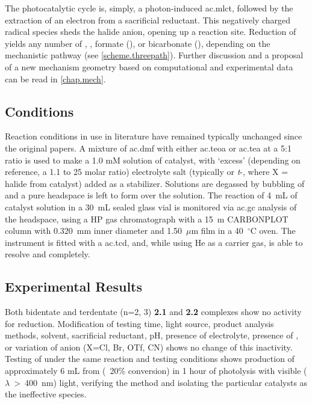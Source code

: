 The photocatalytic cycle is, simply, a photon-induced \gls{ac.mlct}, followed by the extraction of an electron from a sacrificial reductant. This negatively charged radical species sheds the halide anion, opening up a reaction site. Reduction of  yields any number of , , formate (), or bicarbonate (), depending on the mechanistic pathway (see \autoref{scheme.threepath}). Further discussion and a proposal of a new mechanism geometry based on computational and experimental data can be read in \autoref{chap.mech}.

\subsection{Conditions}

Reaction conditions in use in literature have remained typically unchanged since the original papers. A mixture of \gls{ac.dmf} with either \gls{ac.teoa} or \gls{ac.tea} at a 5:1 ratio is used to make a 1.0 mM solution of catalyst, with `excess' (depending on reference, a 1.1 to 25 molar ratio) electrolyte salt (typically  or \textit{t}-, where X = halide from catalyst) added as a stabilizer. Solutions are degassed by bubbling of  and a pure  headspace is left to form over the solution. The reaction of 4~mL of catalyst solution in a 30~mL sealed glass vial is monitored via \gls{ac.gc} analysis of the headspace, using a HP gas chromatograph with a 15~m CARBONPLOT column with 0.320~mm inner diameter and 1.50~$\mu$m film in a 40~$^\circ$C oven. The instrument is fitted with a \gls{ac.tcd}, and, while using He as a carrier gas, is able to resolve  and  completely.  

\subsection{Experimental Results}

Both bidentate and terdentate  (n=2, 3) \textbf{2.1} and \textbf{2.2} complexes show no activity for  reduction. Modification of testing time, light source, product analysis methods, solvent, sacrificial reductant, pH, presence of electrolyte, presence of , or variation of anion (X=Cl, Br, OTf, CN) shows no change of this inactivity. Testing of  under the same reaction and testing conditions shows production of approximately 6 mL  from  (~20\% conversion) in 1 hour of photolysis with visible ($\lambda$~\textgreater ~400~nm) light, verifying the method and isolating the particular catalysts as the ineffective species. 


